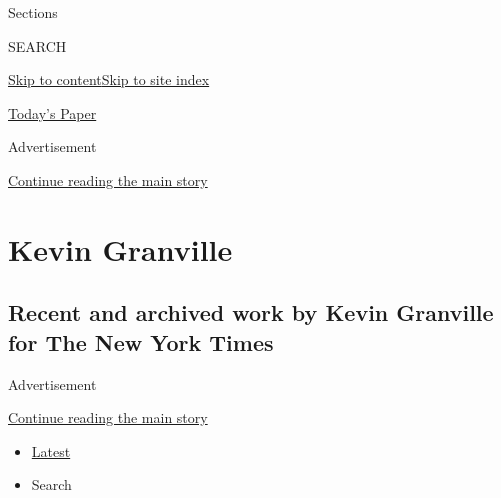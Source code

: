 Sections

SEARCH

\protect\hyperlink{site-content}{Skip to
content}\protect\hyperlink{site-index}{Skip to site index}

\href{https://myaccount.nytimes.com/auth/login?response_type=cookie\&client_id=vi}{}

\href{https://www.nytimes.com/section/todayspaper}{Today's Paper}

Advertisement

\protect\hyperlink{after-top}{Continue reading the main story}

\hypertarget{kevin-granville}{%
\section{Kevin Granville}\label{kevin-granville}}

\hypertarget{recent-and-archived-work-by-kevin-granville-for-the-new-york-times}{%
\subsection{Recent and archived work by Kevin Granville for The New York
Times}\label{recent-and-archived-work-by-kevin-granville-for-the-new-york-times}}

Advertisement

\protect\hyperlink{after-mid1}{Continue reading the main story}

\begin{itemize}
\tightlist
\item
  \protect\hyperlink{stream-panel}{Latest}
\item
  Search
\end{itemize}

